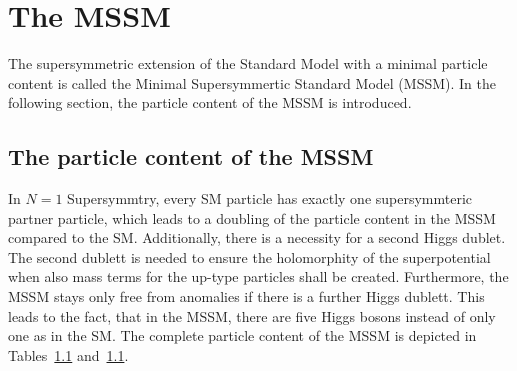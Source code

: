 \section{The MSSM}
\label{sec:MSSM}
The supersymmetric extension of the Standard Model with a minimal particle content is called the Minimal Supersymmertic Standard Model (MSSM).
In the following section, the particle content of the MSSM is introduced.

\subsection{The particle content of the MSSM}
In $N=1$ Supersymmtry, every SM particle has exactly one supersymmteric partner particle, which leads to a doubling of the particle content in the MSSM compared to the SM.
Additionally, there is a necessity for a second Higgs dublet.
The second dublett is needed to ensure the holomorphity of the superpotential when also mass terms for the up-type particles shall be created.
Furthermore, the MSSM stays only free from anomalies if there is a further Higgs dublett.
This leads to the fact, that in the MSSM, there are five Higgs bosons instead of only one as in the SM.
The complete particle content of the MSSM is depicted in Tables~\ref{} and~\ref{}.

